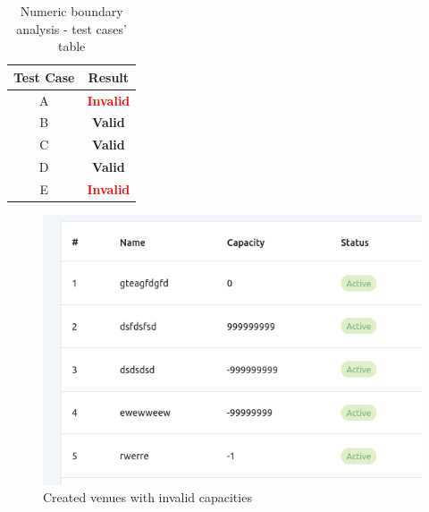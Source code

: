 \begin{justify}
\begin{enumerate}
            \begin{table}[H]
            \caption{Numeric boundary analysis - test cases' table}
            \centering
            \begin{tabular}{|c|c|} 
            \hline
            \rowcolor[rgb]{0.851,0.886,0.953} \textbf{Test Case} & \textbf{Result}                                \\ 
            \hline
            A                                                    & \textbf{\textcolor{red}{Invalid}}              \\ 
            \hline
            B                                                    & \textbf{\textcolor[rgb]{0,0.69,0.314}{Valid}}  \\ 
            \hline
            C                                                    & \textbf{\textcolor[rgb]{0,0.69,0.314}{Valid}}  \\ 
            \hline
            D                                                    & \textbf{\textcolor[rgb]{0,0.69,0.314}{Valid}}  \\ 
            \hline
            E                                                    & \textbf{\textcolor{red}{Invalid}}              \\
            \hline
            \end{tabular}
            \end{table}

            \begin{figure}[H]
                \centerline{\includegraphics[width=120mm,scale=1]{figures/implementation_and_testing/testing/BAT/boundary (3).png}}
                \caption{Created venues with invalid capacities}
                \label{Numeric_boundary_analysis_venue_capacity}
            \end{figure}
    \end{enumerate}



\end{justify}
